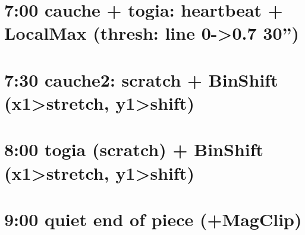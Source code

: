 \section{7:00 cauche + togia: heartbeat + LocalMax (thresh: line 0->0.7 30'')}
\label{sec:org8a1618c}
\section{7:30 cauche2: scratch + BinShift (x1>stretch, y1>shift)}
\label{sec:orge3f9b78}
\section{8:00 togia (scratch) + BinShift (x1>stretch, y1>shift)}
\label{sec:org3e132f2}
\section{9:00 quiet end of piece (+MagClip)}
\label{sec:orgfb8c4f1}
